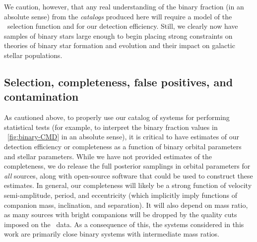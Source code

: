 \documentclass[modern]{aastex63}
\begin{document}


We caution, however, that any real understanding of the binary fraction (in an
absolute sense) from the \emph{catalogs} produced here will require a model of
the \apogee\ selection function and for our detection efficiency.
Still, we clearly now have samples of binary stars large enough to begin placing
strong constraints on theories of binary star formation and evolution and their
impact on galactic stellar populations.


\subsection{Selection, completeness, false positives, and contamination}
\label{sec:completeness}

As cautioned above, to properly use our catalog of systems for performing
statistical tests (for example, to interpret the binary fraction values in
\figurename~\ref{fig:binary-CMD} in an absolute sense), it is critical to have
estimates of our detection efficiency or completeness as a function of binary
orbital parameters and stellar parameters.
While we have not provided estimates of the completeness, we do release the full
posterior samplings in orbital parameters for \emph{all} sources, along with
open-source software that could be used to construct these estimates.
In general, our completeness will likely be a strong function of velocity
semi-amplitude, period, and eccentricity (which implicitly imply functions of
companion mass, inclination, and separation).
It will also depend on mass ratio, as many sources with bright companions will
be dropped by the quality cuts imposed on the \apogee\ data.
As a consequence of this, the systems considered in this work are primarily
close binary systems with intermediate mass ratios.
\end{document}

